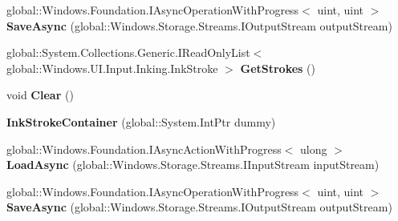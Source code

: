 \begin{DoxyCompactItemize}
\item 
\mbox{\label{class_windows_1_1_u_i_1_1_input_1_1_inking_1_1_ink_stroke_container_a40e4584e1273ad7c496cac055b5d57c9}} 
global\+::\+Windows.\+Foundation.\+I\+Async\+Operation\+With\+Progress$<$ uint, uint $>$ {\bfseries Save\+Async} (global\+::\+Windows.\+Storage.\+Streams.\+I\+Output\+Stream output\+Stream)
\item 
\mbox{\label{class_windows_1_1_u_i_1_1_input_1_1_inking_1_1_ink_stroke_container_af781d5c3e0bfb7e61a701f947102de1a}} 
global\+::\+System.\+Collections.\+Generic.\+I\+Read\+Only\+List$<$ global\+::\+Windows.\+U\+I.\+Input.\+Inking.\+Ink\+Stroke $>$ {\bfseries Get\+Strokes} ()
\item 
\mbox{\label{class_windows_1_1_u_i_1_1_input_1_1_inking_1_1_ink_stroke_container_a30539b293749d997f25488d7f6192d11}} 
void {\bfseries Clear} ()
\item 
\mbox{\label{class_windows_1_1_u_i_1_1_input_1_1_inking_1_1_ink_stroke_container_af018db7df39dc27906b9daad9fb6597c}} 
{\bfseries Ink\+Stroke\+Container} (global\+::\+System.\+Int\+Ptr dummy)
\item 
\mbox{\label{class_windows_1_1_u_i_1_1_input_1_1_inking_1_1_ink_stroke_container_a5616ede4fa36b0beea0b9be54c099ebb}} 
global\+::\+Windows.\+Foundation.\+I\+Async\+Action\+With\+Progress$<$ ulong $>$ {\bfseries Load\+Async} (global\+::\+Windows.\+Storage.\+Streams.\+I\+Input\+Stream input\+Stream)
\item 
\mbox{\label{class_windows_1_1_u_i_1_1_input_1_1_inking_1_1_ink_stroke_container_a40e4584e1273ad7c496cac055b5d57c9}} 
global\+::\+Windows.\+Foundation.\+I\+Async\+Operation\+With\+Progress$<$ uint, uint $>$ {\bfseries Save\+Async} (global\+::\+Windows.\+Storage.\+Streams.\+I\+Output\+Stream output\+Stream)
\item 
\mbox{\label{class_windows_1_1_u_i_1_1_input_1_1_inking_1_1_ink_stroke_container_af781d5c3e0bfb7e61a701f947102de1a}} 

\end{DoxyCompactItemize}
